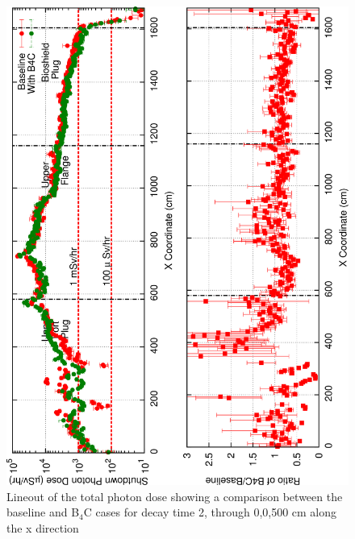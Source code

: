 \documentclass[12pt]{article}
\begin{document}
\begin{figure}[ht!]
\centering
\includegraphics[angle=-90,clip,scale=0.15]{../plots/photon_lineout/dc2_z700_lineout.png}
\caption{Lineout of the total photon dose showing a comparison between the baseline and B$_4$C cases for decay time 2,
                 through 0,0,500 cm along the x direction}
\label{fig:photons_dc2_total_dose_lineout_z700}
\end{figure}
\end{document}
